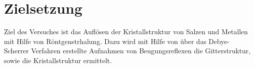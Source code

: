 \section{Zielsetzung}
\label{sec:zielsetzung}
%
Ziel des Versuches  ist das Auflösen der Kristallstruktur von Salzen und Metallen mit Hilfe von Röntgenstrhalung. Dazu wird mit Hilfe von
über das Debye-Scherrer Verfahren erstellte Aufnahmen von Beugungsreflexen die Gitterstruktur, sowie die Kristallstruktur ermittelt.
